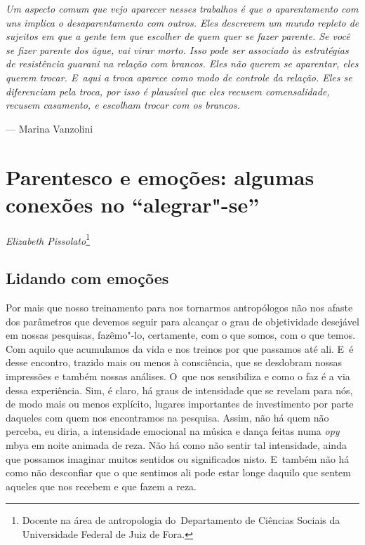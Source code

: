 \clearpage

\vspace*{\fill}

\begin{flushleft}
\begin{minipage}[c]{0.85\textwidth}
\raggedright
\footnotesize
\emph{Um aspecto comum que vejo aparecer nesses trabalhos é que o
aparentamento com uns implica o desaparentamento com outros. Eles
descrevem um mundo repleto de sujeitos em que a gente tem que escolher
de quem quer se fazer parente. Se você se fizer parente dos \emph{ãgue}, vai
virar morto. Isso pode ser associado às estratégias de resistência
guarani na relação com brancos. Eles não querem se aparentar, eles
querem trocar. E~aqui a troca aparece como modo de controle da relação.
Eles se diferenciam pela troca, por isso é plausível que eles recusem
comensalidade, recusem casamento, e escolham trocar com os brancos.}

\smallskip
\hspace*{\fill}--- Marina Vanzolini
\end{minipage}
\end{flushleft}

\chapter{Parentesco e emoções: algumas conexões no
``alegrar"-se''}
\begin{flushright}
\emph{Elizabeth Pissolato}\footnote{Docente na área de antropologia
do~Departamento de Ciências Sociais da Universidade Federal de Juiz de
Fora.}
\end{flushright}

\section{Lidando com emoções}

Por mais que nosso treinamento para nos tornarmos antropólogos não nos
afaste dos parâmetros que devemos seguir para alcançar o grau de
objetividade desejável em nossas pesquisas, fazêmo"-lo, certamente, com
o que somos, com o que temos. Com aquilo que acumulamos da vida e nos
treinos por que passamos até ali. E~é desse encontro, trazido mais ou
menos à consciência, que se desdobram nossas impressões e também nossas
análises. O~que nos sensibiliza e como o faz é a via dessa experiência.
Sim, é claro, há graus de intensidade que se revelam para nós, de modo
mais ou menos explícito, lugares importantes de investimento por parte
daqueles com quem nos encontramos na pesquisa. Assim, não há quem não
perceba, eu diria, a intensidade emocional na música e dança feitas
numa \emph{opy} mbya em noite animada de reza. Não há como não sentir tal
intensidade, ainda que possamos imaginar muitos sentidos ou
significados nisto. E~também não há como não desconfiar que o que
sentimos ali pode estar longe daquilo que sentem aqueles que nos
recebem e que fazem a reza.

